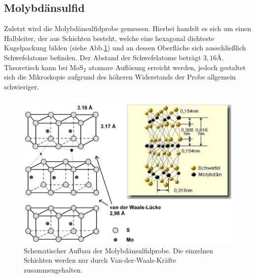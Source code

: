 \subsection{Molybdänsulfid}
Zuletzt wird die Molybdänsulfidprobe gemessen. Hierbei handelt es sich um einen Halbleiter, der aus Schichten besteht, welche eine hexagonal dichteste Kugelpackung bilden (siehe Abb.\ref{mos_struktur}) und an dessen Oberfläche sich ausschließlich Schwefelatome befinden. Der Abstand der Schwefelatome beträgt $3,16\si{\angstrom}$. Theoretisch kann bei $\text{MoS}_{2}$ atomare Auflösung erreicht werden, jedoch gestaltet sich die Mikroskopie aufgrund des höheren Widerstands der Probe allgemein schwieriger.

\begin{figure}[h]
	\centering
	\includegraphics[width=\linewidth]{Mess/mos_struktur}
        \caption{Schematischer Aufbau der Molybdänsulfidprobe. Die einzelnen Schichten werden nur durch Van-der-Waals-Kräfte zusammengehalten. \cite{beschr}}
	\label{mos_struktur}
\end{figure}

